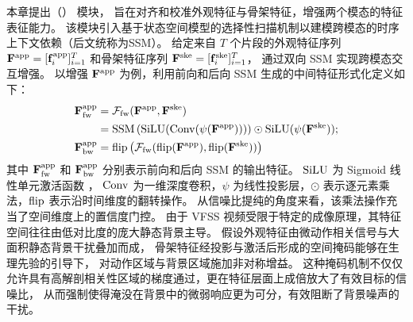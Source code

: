 \textbf{\crossblockfull}\quad 本章提出\crossblockfull（\crossblockshort） 模块，
旨在对齐和校准外观特征与骨架特征，增强两个模态的特征表征能力。
该模块引入基于状态空间模型的选择性扫描机制以建模跨模态的时序上下文依赖（后文统称为SSM）。
给定来自 \(T\) 个片段的外观特征序列 \(\mathbf{F}^{\text{app}} = [\mathbf{f}_i^{\text{app}}]_{i=1}^T\) 和骨架特征序列 \(\mathbf{F}^{\text{ske}} = [\mathbf{f}_i^{\text{ske}}]_{i=1}^T\)，
\crossblockshort 通过双向 SSM 实现跨模态交互增强。
以增强 \(\mathbf{F}^{\text{app}}\) 为例，利用前向和后向 SSM 生成的中间特征形式化定义如下：
\begin{align}\label{eq:fw_ssm}
    \mathbf{F}^{\text{app}}_{\text{fw}} &= \mathcal{F}_{\text{fw}}(\mathbf{F}^{\text{app}},\mathbf{F}^{\text{ske}})\\
    &= {\rm SSM}\left({\rm SiLU}({\rm Conv}(\psi(\mathbf{F}^{\text{app}})))\right) \odot {\rm SiLU}(\psi(\mathbf{F}^{\text{ske}}));\nonumber\\
    \mathbf{F}^{\text{app}}_{\text{bw}}&={\rm flip}\left(\mathcal{F}_{\text{fw}}({\rm flip}(\mathbf{F}^{\text{app}}),{\rm flip}(\mathbf{F}^{\text{ske}}))\right)
\end{align}
其中 \(\mathbf{F}^{\text{app}}_{\text{fw}}\) 和 \(\mathbf{F}^{\text{app}}_{\text{bw}}\) 分别表示前向和后向 SSM 的输出特征。
\({\rm SiLU}\) 为 Sigmoid 线性单元激活函数 \cite{elfwing2018sigmoid}，
\({\rm Conv}\) 为一维深度卷积，\(\psi\) 为线性投影层，\(\odot\) 表示逐元素乘法，\({\rm flip}\) 表示沿时间维度的翻转操作。
从信噪比提纯的角度来看，该乘法操作充当了空间维度上的置信度门控。
由于 VFSS 视频受限于特定的成像原理，其特征空间往往由低对比度的庞大静态背景主导。
假设外观特征由微动作相关信号与大面积静态背景干扰叠加而成，
骨架特征经投影与激活后形成的空间掩码能够在生理先验的引导下，
对动作区域与背景区域施加非对称增益。
这种掩码机制不仅仅允许具有高解剖相关性区域的梯度通过，更在特征层面上成倍放大了有效目标的信噪比，
从而强制使得淹没在背景中的微弱响应更为可分，有效阻断了背景噪声的干扰。

